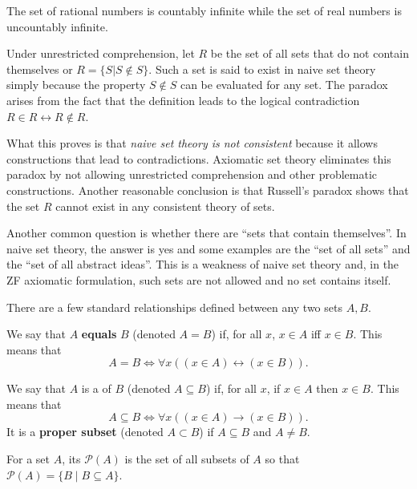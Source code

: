 \begin{example}
The set of rational numbers is countably infinite while the set of real numbers is uncountably infinite.
\end{example}

\begin{example}
Under unrestricted comprehension, let $R$ be the set of all sets that do not contain themselves or $R = \{S|S \notin S\}$.
Such a set is said to exist in naive set theory simply because the property $S \notin S$ can be evaluated for any set.
The paradox arises from the fact that the definition leads to the logical contradiction $R\in R \leftrightarrow R \notin R$.
\end{example}

What this proves is that \emph{naive set theory is not consistent} because it allows constructions that lead to contradictions.
Axiomatic set theory eliminates this paradox by not allowing unrestricted comprehension and other problematic constructions.
Another reasonable conclusion is that Russell's paradox shows that the set $R$ cannot exist in any consistent theory of sets.

Another common question is whether there are ``sets that contain themselves''.
In naive set theory, the answer is yes and some examples are the ``set of all sets'' and the ``set of all abstract ideas''.
This is a weakness of naive set theory and, in the ZF axiomatic formulation, such sets are not allowed and no set contains itself.

There are a few standard relationships defined between any two sets $A,B$.
\begin{definition}
We say that $A$ \textbf{equals} $B$ (denoted $A=B$) if, for all $x$,  $x\in A$ iff $x\in B$.
This means that
\[ A=B \Leftrightarrow \forall x \left( (x\in A)\leftrightarrow (x\in B) \right). \]
\end{definition}

\begin{definition}
We say that $A$ is a  of $B$ (denoted $A\subseteq B$) if, for all $x$, if $x\in A$ then $x\in B$.
This means that
\[ A\subseteq B  \Leftrightarrow \forall x \left( (x\in A)\rightarrow (x\in B) \right). \]
It is a \textbf{proper subset} (denoted $A\subset B$) if $A\subseteq B$ and $A\neq B$.
\end{definition}

\begin{definition}
For a set $A$, its  $\mathcal{P}(A)$ is the set of all subsets of $A$ so that $\mathcal P(A)=\{B\mid B\subseteq A\}$.
\end{definition}

